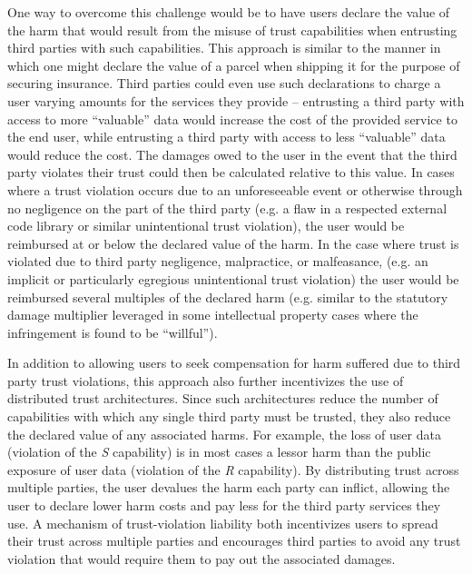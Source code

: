 One way to overcome this challenge would be to have users declare the
value of the harm that would result from the misuse of trust
capabilities when entrusting third parties with such
capabilities. This approach is similar to the manner in which one
might declare the value of a parcel when shipping it for the purpose
of securing insurance. Third parties could even use such declarations
to charge a user varying amounts for the services they provide --
entrusting a third party with access to more ``valuable'' data would
increase the cost of the provided service to the end user, while
entrusting a third party with access to less ``valuable'' data would
reduce the cost. The damages owed to the user in the event that the
third party violates their trust could then be calculated relative to
this value. In cases where a trust violation occurs due to an
unforeseeable event or otherwise through no negligence on the part of
the third party (e.g. a flaw in a respected external code library or
similar unintentional trust violation), the user would be reimbursed
at or below the declared value of the harm. In the case where trust is
violated due to third party negligence, malpractice, or malfeasance,
(e.g. an implicit or particularly egregious unintentional trust
violation) the user would be reimbursed several multiples of the
declared harm (e.g. similar to the statutory damage multiplier
leveraged in some intellectual property cases where the infringement
is found to be ``willful'').

In addition to allowing users to seek compensation for harm suffered
due to third party trust violations, this approach also further
incentivizes the use of distributed trust architectures. Since such
architectures reduce the number of capabilities with which any single
third party must be trusted, they also reduce the declared value of
any associated harms. For example, the loss of user data (violation of
the \emph{S} capability) is in most cases a lessor harm than the
public exposure of user data (violation of the \emph{R}
capability). By distributing trust across multiple parties, the user
devalues the harm each party can inflict, allowing the user to declare
lower harm costs and pay less for the third party services they use. A
mechanism of trust-violation liability both incentivizes users to
spread their trust across multiple parties and encourages third
parties to avoid any trust violation that would require them to pay
out the associated damages.

